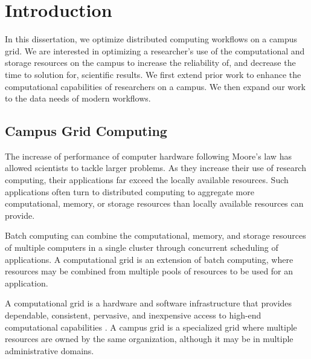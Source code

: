 \chapter{Introduction}

In this dissertation, we optimize distributed computing workflows on a campus grid.  We are interested in optimizing a researcher's use of the computational and storage resources on the campus to increase the reliability of, and decrease the time to solution for, scientific results.  We first extend prior work to enhance the computational capabilities of researchers on a campus.  We then expand our work to the data needs of modern workflows.

\section{Campus Grid Computing}

The increase of performance of computer hardware following Moore's law \cite{schaller1997moore} has allowed scientists to tackle larger problems.  As they increase their use of research computing, their applications far exceed the locally available resources.  Such applications often turn to distributed computing to aggregate more computational, memory, or storage resources than locally available resources can provide.


Batch computing can combine the computational, memory, and storage resources of multiple computers in a single cluster through concurrent scheduling of applications.  A computational grid is an extension of batch computing, where resources may be combined from multiple pools of resources to be used for an application.

A computational grid is a hardware and software infrastructure that provides dependable, consistent, pervasive, and inexpensive access to high-end computational capabilities \cite{foster2004grid}.  A campus grid is a specialized grid where multiple resources are owned by the same organization, although it may be in multiple administrative domains.  

